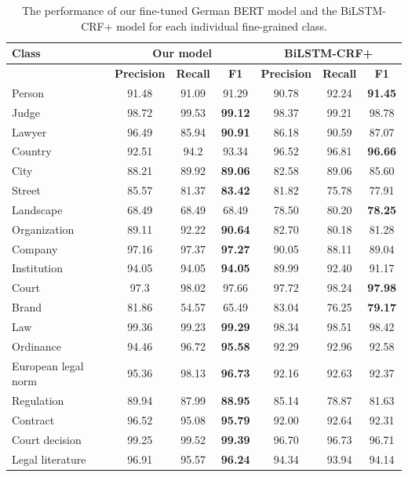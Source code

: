 \documentclass[a4paper,twoside]{article}
\begin{document}
\begin{table}
\centering
\begin{tabular}{l|ccc|ccc}
\hline
\textbf{Class} & \multicolumn{3}{c}{Our model} & \multicolumn{3}{c}{BiLSTM-CRF+} \\
\hline
{} & \textbf{Precision} & \textbf{Recall} & \textbf{F1} & \textbf{Precision} & \textbf{Recall} & \textbf{F1}\\
\hline
Person & 91.48 & 91.09 & 91.29 & 90.78 & 92.24 & \textbf{91.45} \\ 
Judge & 98.72 & 99.53 & \textbf{99.12} & 98.37 & 99.21 & 98.78 \\ 
Lawyer & 96.49 & 85.94 & \textbf{90.91} & 86.18 & 90.59 & 87.07 \\
\hline
Country & 92.51 & 94.2 & 93.34 & 96.52 & 96.81 & \textbf{96.66} \\
City & 88.21 & 89.92 & \textbf{89.06} & 82.58 & 89.06 & 85.60 \\ 
Street & 85.57 & 81.37 & \textbf{83.42} & 81.82 & 75.78 & 77.91 \\ 
Landscape & 68.49 & 68.49 & 68.49 & 78.50 & 80.20 & \textbf{78.25} \\ 
\hline
Organization & 89.11 & 92.22 & \textbf{90.64} & 82.70 & 80.18 & 81.28 \\ 
Company & 97.16 & 97.37 & \textbf{97.27} & 90.05 & 88.11 & 89.04 \\ 
Institution & 94.05 & 94.05 & \textbf{94.05} & 89.99 & 92.40 & 91.17 \\ 
Court & 97.3 & 98.02 & 97.66 & 97.72 & 98.24 & \textbf{97.98} \\ 
Brand & 81.86 & 54.57 & 65.49 & 83.04 & 76.25 & \textbf{79.17} \\
\hline 
Law & 99.36 & 99.23 & \textbf{99.29} & 98.34 & 98.51 & 98.42 \\ 
Ordinance & 94.46 & 96.72 & \textbf{95.58} & 92.29 & 92.96 & 92.58 \\ 
European legal norm & 95.36 & 98.13 & \textbf{96.73} & 92.16 & 92.63 & 92.37 \\
\hline 
Regulation & 89.94 & 87.99 & \textbf{88.95} & 85.14 & 78.87 & 81.63 \\ 
Contract & 96.52 & 95.08 & \textbf{95.79} & 92.00 & 92.64 & 92.31 \\ 
\hline
Court decision & 99.25 & 99.52 & \textbf{99.39} & 96.70 & 96.73 & 96.71 \\
\hline 
Legal literature & 96.91 & 95.57 & \textbf{96.24} & 94.34 & 93.94 & 94.14\\ 
\hline
\end{tabular}
\caption{The performance of our fine-tuned German BERT model and the BiLSTM-CRF+ model for each individual fine-grained class.}
\label{tab:fine-output}
\end{table}
\end{document}
